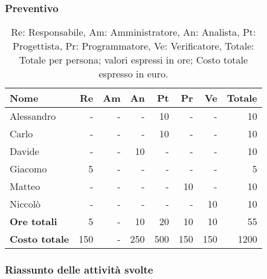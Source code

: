 \subsubsection{Preventivo}

\begin{table}[H]
	\centering
	\begin{tabular}{l|r|r|r|r|r|r|r}
		\textbf{Nome}         & \textbf{Re} & \textbf{Am} & \textbf{An} & \textbf{Pt} & \textbf{Pr} & \textbf{Ve} & \textbf{Totale} \\
		\hline
		Alessandro            & -           & -           & -           & 10          & -           & -           & 10              \\
		Carlo                 & -           & -           & -           & 10          & -           & -           & 10              \\
		Davide                & -           & -           & 10          & -           & -           & -           & 10              \\
		Giacomo               & 5           & -           & -           & -           & -           & -           & 5               \\
		Matteo                & -           & -           & -           & -           & 10          & -           & 10              \\
		Niccolò               & -           & -           & -           & -           & -           & 10          & 10              \\
		\hline
		\textbf{Ore totali}   & 5           & -           & 10          & 20          & 10          & 10          & 55              \\
		\textbf{Costo totale} & 150         & -           & 250         & 500         & 150         & 150         & 1200
	\end{tabular}
	\caption{Re: Responsabile, Am: Amministratore, An: Analista, Pt: Progettista,
		Pr: Programmatore, Ve: Verificatore, Totale: Totale per persona; valori espressi in ore; Costo totale espresso in euro.}
\end{table}

\subsubsection{Riassunto delle attività svolte}

